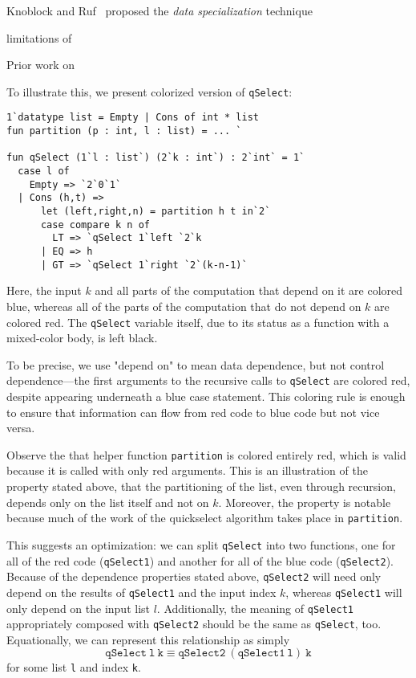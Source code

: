 Knoblock and Ruf~\cite{KR} proposed  the {\em data specialization} technique


limitations of   

 
Prior work on 






To illustrate this, we present colorized version of \texttt{qSelect}:

\begin{lstlisting} 
1`datatype list = Empty | Cons of int * list
fun partition (p : int, l : list) = ... `

fun qSelect (1`l : list`) (2`k : int`) : 2`int` = 1`
  case l of
    Empty => `2`0`1`
  | Cons (h,t) => 
      let (left,right,n) = partition h t in`2`
      case compare k n of
        LT => `qSelect 1`left `2`k
      | EQ => h
      | GT => `qSelect 1`right `2`(k-n-1)`
\end{lstlisting}

Here, the input $k$ and all parts of the computation that depend on it are colored blue,
whereas all of the parts of the computation that do not depend on $k$ are colored red.
The \texttt{qSelect} variable itself, due to its status as a function with a mixed-color body, is left black.


To be precise, we use "depend on" to mean data dependence, but not control dependence---the 
first arguments to the recursive calls to \texttt{qSelect} are colored red,
despite appearing underneath a blue case statement.
This coloring rule is enough to ensure that information can flow from red code to blue code but not vice versa.

Observe the that helper function \texttt{partition} is colored entirely red,
which is valid because it is called with only red arguments.  
This is an illustration of the property stated above, that 
the partitioning of the list, even through recursion, depends only on the list itself and not on $k$.
Moreover, the property is notable because much of the work of the quickselect algorithm takes place in \texttt{partition}.

This suggests an optimization: we can split \texttt{qSelect} into two functions, 
one for all of the red code (\texttt{qSelect1}) and another for all of the blue code (\texttt{qSelect2}). 
Because of the dependence properties stated above, 
\texttt{qSelect2} will need only depend on the results of \texttt{qSelect1} and the input index $k$,
whereas \texttt{qSelect1} will only depend on the input list $l$.
Additionally, the meaning of \texttt{qSelect1} appropriately composed with \texttt{qSelect2} should be the same as \texttt{qSelect}, too.
Equationally, we can represent this relationship as simply 
\[
\mathtt{qSelect~l~k} \equiv \mathtt{qSelect2~(qSelect1~l)~k}
\]
for some list \texttt{l} and index \texttt{k}.


